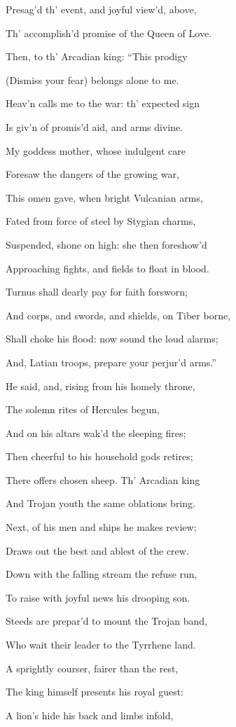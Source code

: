 Presag’d th’ event, and joyful view’d, above,

Th’ accomplish’d promise of the Queen of Love.

Then, to th’ Arcadian king: “This prodigy

(Dismiss your fear) belongs alone to me.

Heav’n calls me to the war: th’ expected sign

Is giv’n of promis’d aid, and arms divine.

My goddess mother, whose indulgent care

Foresaw the dangers of the growing war,

This omen gave, when bright Vulcanian arms,

Fated from force of steel by Stygian charms,

Suspended, shone on high: she then foreshow’d

Approaching fights, and fields to float in blood.

Turnus shall dearly pay for faith forsworn;

And corps, and swords, and shields, on Tiber borne,

Shall choke his flood: now sound the loud alarms;

And, Latian troops, prepare your perjur’d arms.”

He said, and, rising from his homely throne,

The solemn rites of Hercules begun,

And on his altars wak’d the sleeping fires;

Then cheerful to his household gods retires;

There offers chosen sheep. Th’ Arcadian king

And Trojan youth the same oblations bring.

Next, of his men and ships he makes review;

Draws out the best and ablest of the crew.

Down with the falling stream the refuse run,

To raise with joyful news his drooping son.

Steeds are prepar’d to mount the Trojan band,

Who wait their leader to the Tyrrhene land.

A sprightly courser, fairer than the rest,

The king himself presents his royal guest:

A lion’s hide his back and limbs infold,

